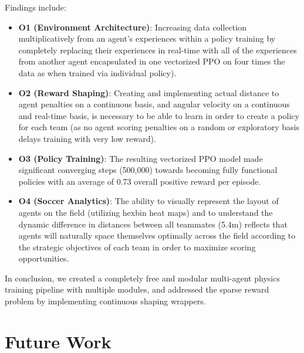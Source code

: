 Findings include:

\begin{itemize}
    \item \textbf{O1 (Environment Architecture)}: Increasing data collection multiplicatively from an agent's experiences within a policy training by completely replacing their experiences in real-time with all of the experiences from another agent encapsulated in one vectorized PPO on four times the data as when trained via individual policy).
    \item \textbf{O2 (Reward Shaping)}: Creating and implementing actual distance to agent penalties on a continuous basis, and angular velocity on a continuous and real-time basis, is necessary to be able to learn in order to create a policy for each team (as no agent scoring penalties on a random or exploratory basis delays training with very low reward).
    \item \textbf{O3 (Policy Training)}: The resulting vectorized PPO model made significant converging steps (500,000) towards becoming fully functional policies with an average of 0.73 overall positive reward per episode.
    \item \textbf{O4 (Soccer Analytics)}: The ability to visually represent the layout of agents on the field (utilizing hexbin heat maps) and to understand the dynamic difference in distances between all teammates (5.4m) reflects that agents will naturally space themselves optimally across the field according to the strategic objectives of each team in order to maximize scoring opportunities.
\end{itemize}

In conclusion, we created a completely free and modular multi-agent physics training pipeline with multiple modules, and addressed the sparse reward problem by implementing continuous shaping wrappers.

\section{Future Work}
\label{sec:future_work}

